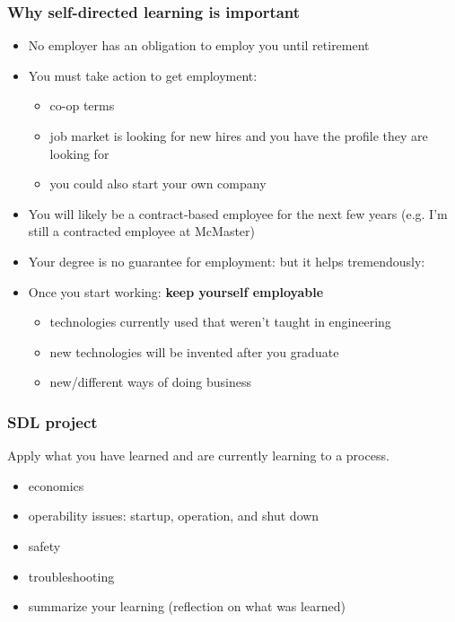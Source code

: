 \begin{frame}\frametitle{Why self-directed learning is important}
	\begin{itemize}
		\item	No employer has an obligation to employ you until retirement
		\item	You must take action to get employment:
		\begin{itemize}
			\item	co-op terms
			\item	job market is looking for new hires and you have the profile they are looking for
			\item	you could also start your own company
		\end{itemize}
		\pause
		\item	You will likely be a contract-based employee for the next few years (e.g. I'm still a contracted employee at McMaster)
		\item	Your degree is no guarantee for employment: but it helps tremendously: {}
		\pause
		\item	Once you start working: \textbf{keep yourself employable}
		\begin{itemize}
			\item	technologies currently used that weren't taught in engineering
			\item	new technologies will be invented after you graduate
			\item	new/different ways of doing business			
		\end{itemize}
	\end{itemize}
\end{frame}

\begin{frame}\frametitle{SDL project}
	Apply what you have learned and are currently learning to a process.
	\vspace{12pt}
	\begin{itemize}
		\item	economics
		\item	operability issues: startup, operation, and shut down
		\item	safety
		\item	troubleshooting
		\item	summarize your learning (reflection on what was learned)
	\end{itemize}
\end{frame}

